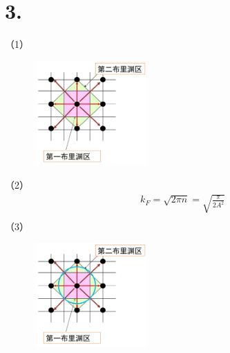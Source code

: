 \documentclass[UTF8]{ctexart}
\begin{document}
\section*{3.}
（1）
\begin{figure}[H]                                        
    \centering                                                
    \includegraphics[width=4.5cm,height=4cm]{ans-3-1.jpg}        
    \caption*{}                                                                                   
\end{figure}
（2）
\begin{equation*}
    \begin{aligned}
       & k_F=\sqrt{2\pi n}=\sqrt{\frac{\pi}{2A^2}}\\ 
    \end{aligned}
\end{equation*}
（3）
\begin{figure}[H]                                        
    \centering                                                
    \includegraphics[width=4.5cm,height=4cm]{ans-3-3.jpg}        
    \caption*{}                                                                                   
\end{figure}
\end{document}
